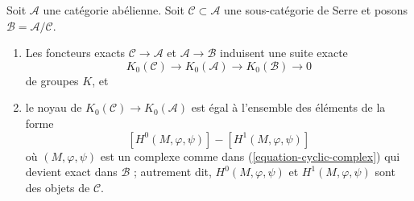\begin{lemma}
\label{lemma-serre-subcategory-K-groups}
Soit $\mathcal{A}$ une catégorie abélienne.
Soit $\mathcal{C} \subset \mathcal{A}$ une sous-catégorie de Serre et
posons $\mathcal{B} = \mathcal{A}/\mathcal{C}$.
\begin{enumerate}
\item Les foncteurs exacts $\mathcal{C} \to \mathcal{A}$ et
$\mathcal{A} \to \mathcal{B}$ induisent une suite exacte
$$
K_0(\mathcal{C}) \to
K_0(\mathcal{A}) \to
K_0(\mathcal{B}) \to
0
$$
de groupes $K$, et
\item le noyau de $K_0(\mathcal{C}) \to K_0(\mathcal{A})$ est égal
à l'ensemble des éléments de la forme
$$
[H^0(M, \varphi, \psi)] - [H^1(M, \varphi, \psi)]
$$
où $(M, \varphi, \psi)$ est un complexe comme dans (\ref{equation-cyclic-complex})
qui devient exact dans $\mathcal{B}$ ; autrement dit,
$H^0(M, \varphi, \psi)$ et $H^1(M, \varphi, \psi)$ sont des
objets de $\mathcal{C}$.
\end{enumerate}
\end{lemma}

